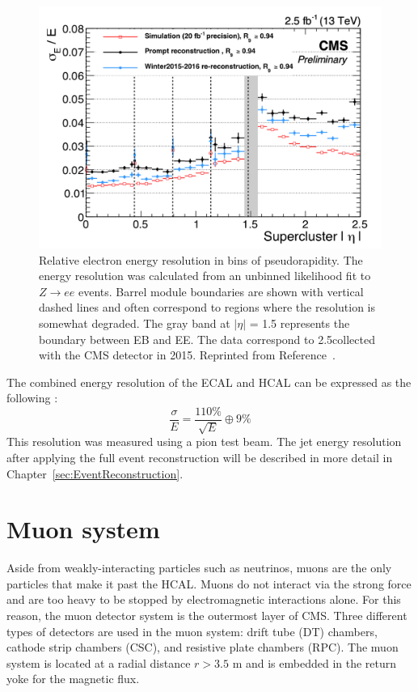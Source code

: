 \begin{figure}[h!]
	\centering
	\includegraphics[width=\linewidth]{Figures/Detector/EcalEnergyResolution.png}
       \caption{Relative electron energy resolution in bins of pseudorapidity. 
       The energy resolution was calculated from an unbinned likelihood fit to $Z\rightarrow ee$ events.
        Barrel module boundaries are shown with vertical dashed lines and often correspond to regions where the resolution is somewhat degraded. The gray band at $|\eta|$ = 1.5 represents the boundary between EB and EE.
        The data correspond to 2.5\fbinv collected with the CMS detector in 2015.
        Reprinted from Reference~\cite{ECALDPGtwiki2}.}
         \label{fig:ecal_resolution}
\end{figure}

The combined energy resolution of the ECAL and HCAL can be expressed as the following \cite{ParticleFlow}:
\begin{equation}
\frac{\sigma}{E} = \frac{110\%}{\sqrt{E}} \oplus 9\% 
\end{equation}
This resolution was measured using a pion test beam. The jet energy resolution after applying the full event reconstruction will be described in more detail in Chapter~\ref{sec:EventReconstruction}.



\section{Muon system}
\label{sec:Muon}
Aside from weakly-interacting particles such as neutrinos, muons are the only particles that make it past the HCAL. Muons do not interact via the strong force and are too heavy to be stopped by electromagnetic interactions alone. For this reason, the muon detector system is the outermost layer of CMS. Three different types of detectors are used in the muon system: drift tube (DT) chambers, cathode strip chambers (CSC), and resistive plate chambers (RPC). The muon system is located at a radial distance $r > 3.5$ m and is embedded in the return yoke for the magnetic flux.

